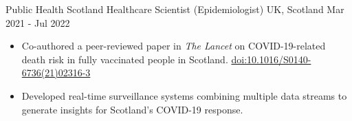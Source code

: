 \cventry
{Public Health Scotland} %
{Healthcare Scientist (Epidemiologist)} %
{UK, Scotland} %
{Mar 2021 - Jul 2022} %
{
\begin{itemize}
   \item Co-authored a peer-reviewed paper in \textit{The Lancet} on COVID-19-related death risk in fully vaccinated people in Scotland. \href{https://www.thelancet.com/journals/lancet/article/PIIS0140-6736(21)02316-3/fulltext}{doi:10.1016/S0140-6736(21)02316-3}
   \item Developed real-time surveillance systems combining multiple data streams to generate insights for Scotland's COVID-19 response.
\end{itemize}
}
